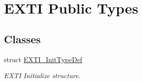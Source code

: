 \hypertarget{group___e_x_t_i___public___types}{\section{\-E\-X\-T\-I \-Public \-Types}
\label{group___e_x_t_i___public___types}
}
\subsection*{\-Classes}
\begin{DoxyCompactItemize}
\item 
struct \hyperlink{struct_e_x_t_i___init_type_def}{\-E\-X\-T\-I\-\_\-\-Init\-Type\-Def}
\begin{DoxyCompactList}\small\item\em \-E\-X\-T\-I \-Initialize structure. \end{DoxyCompactList}\end{DoxyCompactItemize}
